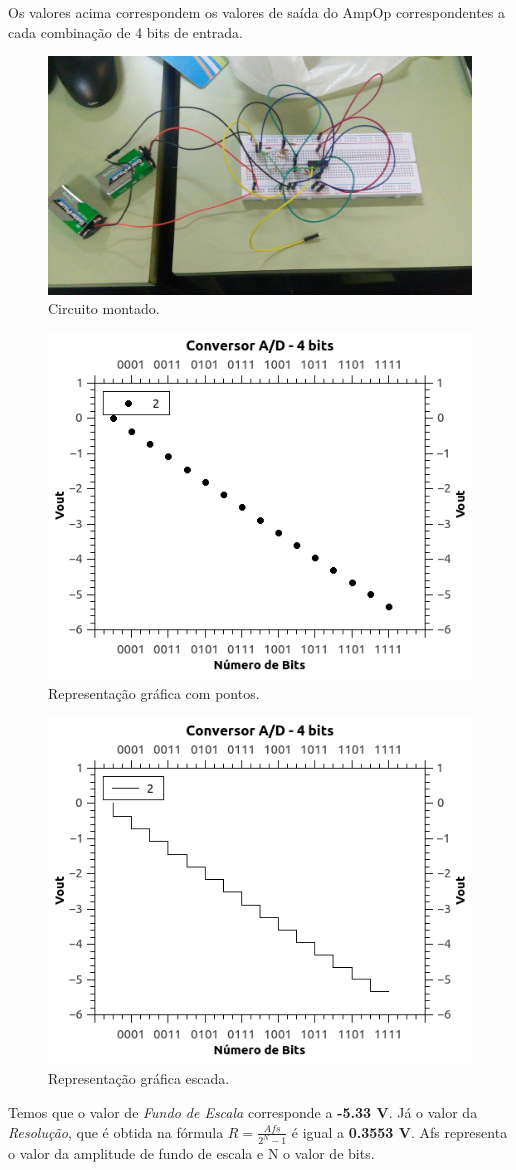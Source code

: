 \documentclass[12pt]{article}
\begin{document}
Os valores acima correspondem os valores de saída do AmpOp correspondentes a cada combinação de 4 bits de entrada.

\begin{figure}[H]
\centering
\includegraphics[width=.5\textwidth]{circuito2.jpeg}
\caption{Circuito montado.}
\label{fig:circuito2}
\end{figure}

\begin{figure}[H]
\centering
\includegraphics[width=.5\textwidth]{grafico4bitdot.jpeg}
\caption{Representação gráfica com pontos.}
\label{fig:4bitdot}
\end{figure}

\begin{figure}[H]
\centering
\includegraphics[width=.5\textwidth]{grafico4bit.jpeg}
\caption{Representação gráfica escada.}
\label{fig:4bit}
\end{figure}

Temos que o valor de \textit{Fundo de Escala} corresponde a \textbf{-5.33 V}. Já o valor da \textit{Resolução}, que é obtida na fórmula $R = \frac{Afs}{2^N-1}$ é igual a \textbf{0.3553 V}.  Afs representa o valor da amplitude de fundo de escala e N o valor de bits.
\end{document}
